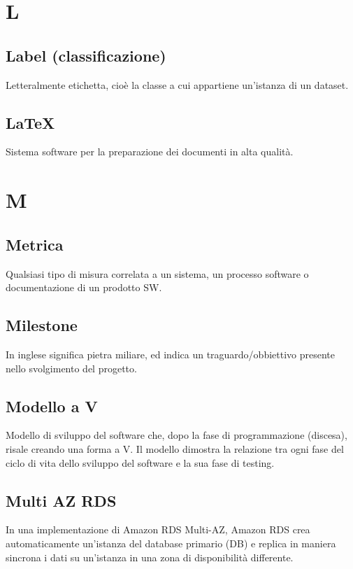 \documentclass{classes/base}
\begin{document}
    \section{L}
        \subsection*{Label (classificazione)}
        Letteralmente etichetta, cioè la classe a cui appartiene un'istanza di un dataset.
        
        \subsection*{LaTeX}
        Sistema software per la preparazione dei documenti in alta qualità.

    \newpage  
    \section{M} 
        \subsection*{Metrica}
        Qualsiasi tipo di misura correlata a un sistema, un processo software  o  documentazione  di  un  prodotto  SW. 

        \subsection*{Milestone}
        In inglese significa pietra miliare, ed indica un traguardo/obbiettivo presente nello svolgimento del progetto.
        
        \subsection*{Modello a V}
        Modello di sviluppo del software che, dopo la fase di programmazione (discesa), risale creando una forma a V. Il modello dimostra la relazione tra ogni fase del ciclo di vita dello sviluppo del software e la sua fase di testing.

        \subsection*{Multi AZ RDS} 
        In una implementazione di Amazon RDS Multi-AZ, Amazon RDS crea automaticamente un’istanza del database primario (DB) e replica in maniera sincrona i dati su un’istanza in una zona di disponibilità differente.
\end{document}
